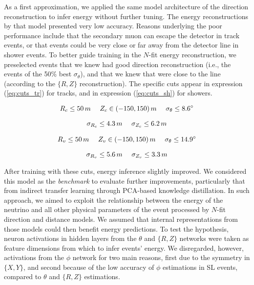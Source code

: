 As a first approximation, we applied the same model architecture of the direction reconstruction to infer energy without further tuning. The energy reconstructions by that model presented very low accuracy. Reasons underlying the poor performance include that the secondary muon can escape the detector in track events, or that events could be very close or far away from the detector line in shower events. To better guide training in the $N$-fit energy reconstruction, we preselected events that we knew had good direction reconstruction (i.e., the events of the 50\% best $\sigma_\theta$), and that we knew that were close to the line (according to the $\{R,Z\}$ reconstruction). The specific cuts appear in expression (\ref{eq:cuts_tr}) for tracks, and in expression (\ref{eq:cuts_sh}) for showers.

\begin{equation}
\setlength{\jot}{10pt}
	\label{eq:cuts_tr}
	\begin{gathered}
		R_c \leq 50\,m~~~~Z_c \in (-150, 150)\,m~~~~\sigma_\theta\leq8.6^\circ\\
		\sigma_{R_c} \leq 4.3\,m~~~~\sigma_{Z_c} \leq 6.2\,m
	\end{gathered}
\end{equation}

\begin{equation}
\setlength{\jot}{10pt}
	\label{eq:cuts_sh}
	\begin{gathered}
		R_v \leq 50\,m~~~~Z_v \in (-150, 150)\,m~~~~\sigma_\theta\leq 14.9^\circ\\
		\sigma_{R_v} \leq 5.6\,m~~~~\sigma_{Z_v} \leq 3.3\,m
	\end{gathered}
\end{equation}

After training with these cuts, energy inference slightly improved. We considered this model as the \textit{benchmark} to evaluate further improvements, particularly that from indirect transfer learning through PCA-based knowledge distillation. In such approach, we aimed to exploit the relationship between the energy of the neutrino and all other physical parameters of the event processed by $N$-fit direction and distance models. We assumed that internal representations from those models could then benefit energy predictions. To test the hypothesis, neuron activations in hidden layers from the $\theta$ and $\{R,Z\}$ networks were taken as feature dimensions from which to infer events' energy. We disregarded, however, activations from the $\phi$ network for two main reasons, first due to the symmetry in $\{X,Y\}$, and second because of the low accuracy of $\phi$ estimations in SL events, compared to $\theta$ and $\{R,Z\}$ estimations.

